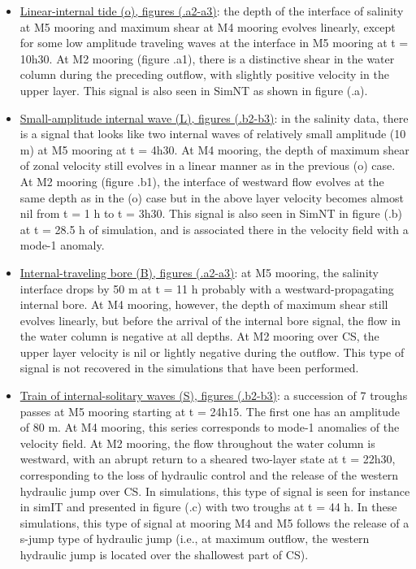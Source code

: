 \begin{itemize}
\item \underline{Linear-internal tide (o), figures (.a2-a3)}: the depth of the interface of salinity at M5 mooring and maximum shear at M4 mooring evolves linearly, except for some low amplitude traveling waves at the interface in M5 mooring at t = 10h30. At M2 mooring (figure .a1), there is a distinctive shear in the water column during the preceding outflow, with slightly positive velocity in the upper layer. This signal is also seen in SimNT as shown in figure (.a).
%
\item \underline{Small-amplitude internal wave (L), figures (.b2-b3)}: in the salinity data, there is a signal that looks like two internal waves of relatively small amplitude (10 m) at M5 mooring at t = 4h30. At M4 mooring, the depth of maximum shear of zonal velocity still evolves in a linear manner as in the previous (o) case. At M2 mooring (figure .b1), the interface of westward flow evolves at the same depth as in the (o) case but in the above layer velocity becomes almost nil from t = 1 h to t = 3h30. This signal is also seen in SimNT in figure (.b) at t = 28.5 h of simulation, and is associated there in the velocity field with a mode-1 anomaly.
%
\item \underline{Internal-traveling bore (B), figures (.a2-a3)}: at M5 mooring, the salinity interface drops by 50 m at t = 11 h probably with a westward-propagating internal bore. At M4 mooring, however, the depth of maximum shear still evolves linearly, but \color{blue} before \color{black} the arrival of the internal bore signal, the flow in the water column is negative at all depths. At M2 mooring over CS, the upper layer velocity is nil or lightly negative during the outflow. This type of signal is not recovered in the simulations that have been performed.
%
\item \underline{Train of internal-solitary waves (S), figures (.b2-b3)}: a succession of 7 troughs passes at M5 mooring starting at t = 24h15. The first one has an amplitude of 80 m. At M4 mooring, this series corresponds to mode-1 anomalies of the velocity field. At M2 mooring, the flow throughout the water column is westward, with an abrupt return to a sheared two-layer state at t = 22h30, corresponding to the loss of hydraulic control and the release of the western hydraulic jump over CS. In simulations, this type of signal is seen for instance in simIT and presented in figure (.c) with two troughs at  t = 44 h. In these simulations, this type of signal at mooring M4 and M5 follows the release of a s-jump type of hydraulic jump (i.e., at maximum outflow, the western hydraulic jump is located over the shallowest part of CS).

\end{itemize}
